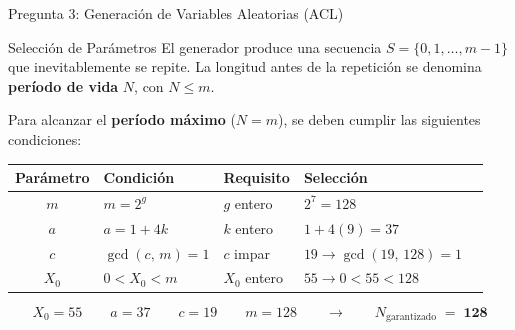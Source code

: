\documentclass[aspectratio=169, 10pt]{beamer}
\begin{document}
\begin{frame}{Pregunta 3: Generación de Variables Aleatorias (ACL)}
	\begin{exampleblock}{Selección de Parámetros}
		\justifying
		El generador produce una secuencia $S = \{0,1,\ldots,m{-}1\}$ que
		inevitablemente se repite. La longitud antes de la repetición se denomina
		\textbf{período de vida} $N$, con $N \leq m$.

		\vspace{0.4em}
		Para alcanzar el \textbf{período máximo} ($N = m$), se deben cumplir las siguientes condiciones:

		\vspace{0.3em}
		\begin{center}
			\renewcommand{\arraystretch}{1.35}
			\setlength{\tabcolsep}{10pt}
			\begin{tabular}{cllll}
				\toprule
				\textbf{Parámetro} & \textbf{Condición}                  & \textbf{Requisito} & \textbf{Selección} & \\
				\midrule
				$m$                & $m = 2^{g}$                         & $g$ entero
				                   & $2^7=128$                           & \checkmark                                \\
				$a$                & $a = 1 + 4k$                        & $k$ entero
				                   & $1 + 4(9) = 37$                     & \checkmark                                \\
				$c$                & $\gcd(c,\,m) = 1$                   & $c$ impar
				                   & $19 \rightarrow \gcd(19,\,128) = 1$ & \checkmark                                \\
				$X_0$              & $0 < X_0 < m$                       & $X_0$ entero
				                   & $55 \rightarrow 0 < 55 < 128$       & \checkmark                                \\
				\bottomrule
			\end{tabular}
		\end{center}
		\vspace{4pt}
		\[ X_0 = 55 \qquad a = 37 \qquad c = 19 \qquad m = 128 \qquad \rightarrow \qquad N_{\text{garantizado}} \;=\; \mathbf{128}\]
	\end{exampleblock}
\end{frame}
\end{document}
